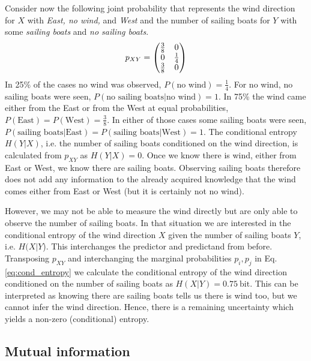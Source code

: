Consider now the following joint probability that represents the wind direction for $X$ with \emph{East, no wind,} and \emph{West} and
the number of sailing boats for $Y$ with some \emph{sailing boats} and \emph{no sailing boats}.
\begin{equation}
	p_{XY} = \begin{pmatrix} \tfrac{3}{8} & 0 \\
				0 & \tfrac{1}{4} \\
				\tfrac{3}{8} & 0 \end{pmatrix}
\end{equation}
In 25\% of the cases no wind was observed, $P(\text{no wind}) = \tfrac{1}{4}$. For no wind, no sailing boats were seen,
$P(\text{no sailing boats} \vert \text{no wind}) = 1$. In 75\% the wind came either from the East or from the West at
equal probabilities, $P(\text{East}) = P(\text{West}) = \tfrac{3}{8}$. In either of those cases some sailing boats were seen,
$P(\text{sailing boats} \vert \text{East}) = P(\text{sailing boats} \vert \text{West}) =1$. The conditional entropy $H(Y \vert X)$,
i.e. the number of sailing boats conditioned on the wind direction, is calculated from $p_{XY}$ as $H(Y \vert X) = 0$. Once
we know there is wind, either from East or West, we know there are sailing boats. Observing sailing boats therefore does 
not add any information to the already acquired knowledge that the wind comes either from East or West (but it is certainly not
no wind).

However, we may not be able to measure the wind directly but are only able to observe the number of sailing boats.
In that situation we are interested in the conditional entropy of the wind direction $X$ given the number of sailing boats $Y$, i.e.
$H(X\vert Y$). This interchanges the predictor and predictand from before. Transposing $p_{XY}$ and interchanging the
marginal probabilities $p_i, p_j$ in Eq. \ref{eq:cond_entropy} we calculate the conditional entropy of the wind direction
conditioned on the number of sailing boats as $H(X\vert Y) = 0.75~\mathrm{bit}$.
This can be interpreted as knowing there are sailing boats tells us there is wind too, but we cannot infer the wind direction.
Hence, there is a remaining uncertainty which yields a non-zero (conditional) entropy.

\subsection{Mutual information}

